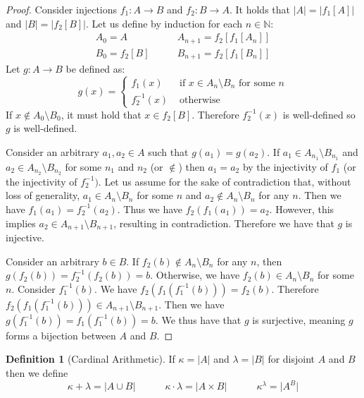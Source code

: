 \documentclass{article}
\theoremstyle{definition}
\newtheorem{defn}[thm]{Definition}
\newcommand{\N}{\mathbb{N}}
\newcommand{\abs}[1]{\lvert#1\rvert}
\begin{document}
\begin{proof}
    Consider injections $f_1: A \to B$ and $f_2: B \to A$. It holds that $\abs{A} = \abs{f_1[A]}$ and $\abs{B} = \abs{f_2[B]}$.
    Let us define by induction for each $n \in \N$:
    \begin{align*}
        A_0 = A \quad & \quad A_{n + 1} = f_2[f_1[A_n]]
        \\
        B_0 = f_2[B] \quad & \quad B_{n + 1} = f_2[f_1[B_n]]
    \end{align*}
    Let $g: A \to B$ be defined as:
    \[
        g(x) =
        \begin{cases*}
            f_1(x) & \text{ if $x \in A_n \setminus B_n$ for some $n$}
            \\
            f_{2}^{-1}(x) & \text{ otherwise}
        \end{cases*}    
    \]
    If $x \not\in A_0 \setminus B_0$, it must hold that $x \in f_2[B]$. Therefore $f_{2}^{-1}(x)$ is well-defined so $g$ is well-defined.
    
    Consider an arbitrary $a_1, a_2 \in A$ such that $g(a_1) = g(a_2)$. If $a_1 \in A_{n_1} \setminus B_{n_1}$ and $a_2 \in A_{n_2} \setminus B_{n_2}$ for some $n_1$ and $n_2$ (or $\not\in$) then $a_1 = a_2$ by the injectivity of $f_1$ (or the injectivity of $f_{2}^{-1})$. Let us assume for the sake of contradiction that, without loss of generality, $a_1 \in A_n \setminus B_n$ for some $n$ and $a_2 \not\in A_n \setminus B_n$ for any $n$. Then we have $f_{1}(a_1) = f_{2}^{-1}(a_2)$. Thus we have $f_2(f_1(a_1)) = a_2$. However, this implies $a_2 \in A_{n + 1} \setminus B_{n + 1}$, resulting in contradiction. Therefore we have that $g$ is injective.

    Consider an arbitrary $b \in B$. If $f_{2}(b) \not\in A_n \setminus B_n$ for any $n$, then $g(f_{2}(b)) = f_{2}^{-1}(f_{2}(b)) = b$. Otherwise, we have $f_{2}(b) \in A_n \setminus B_n$ for some $n$. Consider $f_{1}^{-1}(b)$. We have $f_2(f_1(f_{1}^{-1}(b))) = f_2(b)$. Therefore $f_2(f_1(f_{1}^{-1}(b))) \in A_{n + 1} \setminus B_{n + 1}$. Then we have $g(f_{1}^{-1}(b)) = f_1(f_{1}^{-1}(b)) = b$. We thus have that $g$ is surjective, meaning $g$ forms a bijection between $A$ and $B$. 
\end{proof}

\begin{defn}[Cardinal Arithmetic]
    If $\kappa = \abs{A}$ and $\lambda = \abs{B}$ for disjoint $A$ and $B$ then we define 
    \[
        \kappa + \lambda = \abs{A \cup B}
        \quad\quad\quad
        \kappa \cdot \lambda = \abs{A \times B} 
        \quad\quad\quad
        \kappa^\lambda = \abs{A^B}    
    \]
\end{defn}
\end{document}
